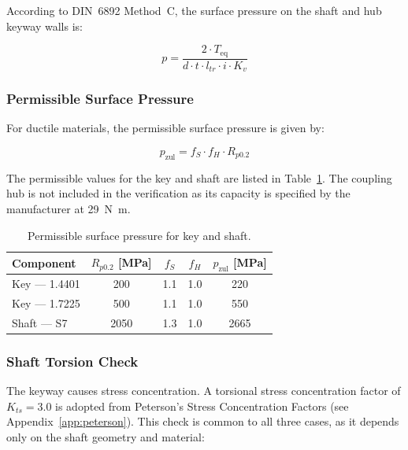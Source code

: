\documentclass[11pt,a4paper,twoside,openright]{book}
\begin{document}
According to DIN~6892 Method~C, the surface pressure on the shaft and hub keyway walls is:
 
\begin{equation}
    p = \frac{2 \cdot T_{\text{eq}}}{d \cdot t \cdot l_{tr} \cdot i \cdot K_v}
    \label{eq:surface_pressure}
\end{equation}
 
\subsubsection{Permissible Surface Pressure}
 
For ductile materials, the permissible surface pressure is given by:
 
\begin{equation}
    p_{\text{zul}} = f_S \cdot f_H \cdot R_{p0.2}
    \label{eq:p_permissible}
\end{equation}
 
The permissible values for the key and shaft are listed in Table~\ref{tab:p_zul}. The coupling hub is not included in the verification as its capacity is specified by the manufacturer at \SI{29}{\newton\metre}.
 
\begin{table}[htbp]
    \centering
    \begin{tabular}{l c c c c}
        \hline
        \textbf{Component} & $R_{p0.2}$ [\si{\mega\pascal}] & $f_S$ & $f_H$ & $p_{\text{zul}}$ [\si{\mega\pascal}] \\
        \hline
        Key --- 1.4401      & 200   & 1.1 & 1.0 & 220  \\
        Key --- 1.7225     & 500   & 1.1 & 1.0 & 550  \\
        Shaft --- S7        & 2050  & 1.3 & 1.0 & 2665 \\
        \hline
    \end{tabular}
    \caption{Permissible surface pressure for key and shaft.}
    \label{tab:p_zul}
\end{table}
 
\subsubsection{Shaft Torsion Check}
 
The keyway causes stress concentration. A torsional stress concentration factor of $K_{ts} = 3.0$ is adopted from Peterson's Stress Concentration Factors (see Appendix~\ref{app:peterson}). This check is common to all three cases, as it depends only on the shaft geometry and material:
 
\end{document}
